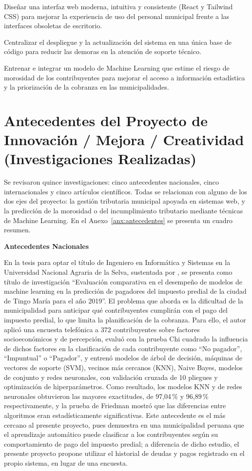 \documentclass[12pt,a4paper]{report}
\newcommand{\subtitulo}[1]{\par\vspace{4pt}\noindent\textbf{#1}\par}
\begin{document}
Diseñar una interfaz web moderna, intuitiva y consistente (React y Tailwind CSS) para mejorar la experiencia de uso del personal municipal frente a las interfaces obsoletas de escritorio.

Centralizar el despliegue y la actualización del sistema en una única base de código para reducir las demoras en la atención de soporte técnico.

Entrenar e integrar un modelo de Machine Learning que estime el riesgo de morosidad de los contribuyentes para mejorar el acceso a información estadística y la priorización de la cobranza en las municipalidades.

\section{Antecedentes del Proyecto de Innovación / Mejora / Creatividad (Investigaciones Realizadas)}
\label{sec:antec}

Se revisaron quince investigaciones: cinco antecedentes nacionales, cinco internacionales y cinco artículos científicos. Todas se relacionan con alguno de los dos ejes del proyecto: la gestión tributaria municipal apoyada en sistemas web, y la predicción de la morosidad o del incumplimiento tributario mediante técnicas de Machine Learning. En el Anexo~\ref{anx:antecedentes} se presenta un cuadro resumen.

\subtitulo{Antecedentes Nacionales}

En la tesis para optar el título de Ingeniero en Informática y Sistemas en la Universidad Nacional Agraria de la Selva, sustentada por \textcite{juncoaranciaga2023}, se presenta como título de investigación ``Evaluación comparativa en el desempeño de modelos de machine learning en la predicción de pagadores del impuesto predial de la ciudad de Tingo María para el año 2019''. El problema que aborda es la dificultad de la municipalidad para anticipar qué contribuyentes cumplirán con el pago del impuesto predial, lo que limita la planificación de la cobranza. Para ello, el autor aplicó una encuesta telefónica a 372 contribuyentes sobre factores socioeconómicos y de percepción, evaluó con la prueba Chi cuadrado la influencia de dichos factores en la clasificación de cada contribuyente como ``No pagador'', ``Impuntual'' o ``Pagador'', y entrenó modelos de árbol de decisión, máquinas de vectores de soporte (SVM), vecinos más cercanos (KNN), Naive Bayes, modelos de conjunto y redes neuronales, con validación cruzada de 10 pliegues y optimización de hiperparámetros. Como resultado, los modelos KNN y de redes neuronales obtuvieron las mayores exactitudes, de 97,04\,\% y 96,89\,\% respectivamente, y la prueba de Friedman mostró que las diferencias entre algoritmos eran estadísticamente significativas. Este antecedente es el más cercano al presente proyecto, pues demuestra en una municipalidad peruana que el aprendizaje automático puede clasificar a los contribuyentes según su comportamiento de pago del impuesto predial; a diferencia de dicho estudio, el presente proyecto propone utilizar el historial de deudas y pagos registrado en el propio sistema, en lugar de una encuesta.
\end{document}
